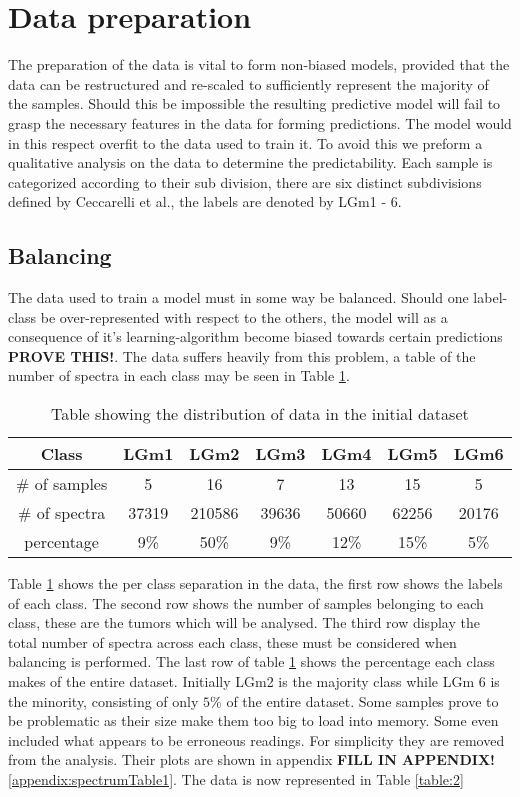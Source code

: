 \section{Data preparation}
The preparation of the data is vital to form non-biased models, provided that the data can be restructured and re-scaled to sufficiently represent the majority of the samples. Should this be impossible the resulting predictive model will fail to grasp the necessary features in the data for forming predictions. The model would in this respect overfit to the data used to train it. To avoid this we preform a qualitative analysis on the data to determine the predictability. Each sample is categorized according to their sub division, there are six distinct subdivisions defined by Ceccarelli et al.\cite{cellsubsets}, the labels are denoted by LGm1 - 6.

\subsection{Balancing}
The data used to train a model must in some way be balanced. Should one label-class be over-represented with respect to the others, the model will as a consequence of it's learning-algorithm become biased towards certain predictions \textbf{PROVE THIS!}. The data suffers heavily from this problem, a table of the number of spectra in each class may be seen in Table \ref{table:1}.
\\

\begin{table}[h!]
\centering
 \begin{tabular}{||c c c c c c c||} 
 \hline
 Class & LGm1 & LGm2 & LGm3 & LGm4 & LGm5 & LGm6 \\ [0.5ex] 
 \hline\hline
 \# of samples & 5& 16 & 7 & 13 & 15 & 5 \\ 
 \hline
 \# of spectra & 37319 & 210586 & 39636 & 50660 & 62256 & 20176 \\
 \hline
 percentage & 9\%& 50\% & 9\% & 12\% & 15\% & 5\% \\
 \hline

\end{tabular}
\caption{Table showing the distribution of data in the initial dataset}
\label{table:1}
\end{table}

\newpage
Table \ref{table:1} shows the per class separation in the data, the first row shows the labels of each class. The second row shows the number of samples belonging to each class, these are the tumors which will be analysed. The third row display the total number of spectra across each class, these must be considered when balancing is performed. The last row of table \ref{table:1} shows the percentage each class makes of the entire dataset. Initially LGm2 is the majority class while LGm 6 is the minority, consisting of only $5$\% of the entire dataset. Some samples prove to be problematic as their size make them too big to load into memory. Some even included what appears to be erroneous readings. For simplicity they are removed from the analysis. Their plots are shown in appendix \textbf{FILL IN APPENDIX!}\ref{appendix:spectrumTable1}. The data is now represented in Table \ref{table:2}
\\

